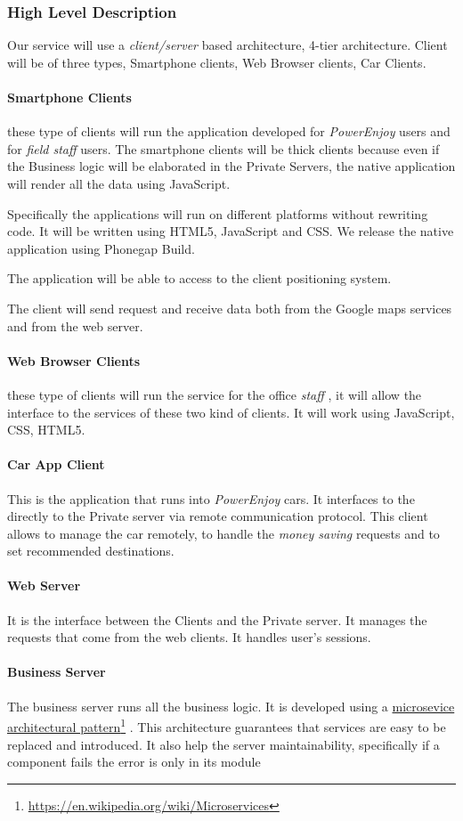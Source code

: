 \documentclass[english]{article}
\newcommand\fnurl[2]{%
	\href{#2}{#1}\footnote{\url{#2}}%
}
\newcommand{\powerenjoy}{\textit{PowerEnjoy }}
\newcommand{\staff}{\textit{staff }}
\newcommand{\fieldstaff}{\textit{field staff }}
\newcommand{\moneysaving}{\textit{money saving }}
\begin{document}
	\subsubsection{High Level Description}
	Our service will use a \textit{client/server} based architecture, 4-tier architecture. Client will be of three types, Smartphone clients, Web Browser clients, Car Clients.
	\paragraph{Smartphone Clients} these type of clients will run the application developed for \powerenjoy users and for \fieldstaff users. The smartphone clients will be thick clients because even  if the Business logic will be elaborated in the Private Servers, the native application will render all the data using JavaScript. 
		\par Specifically the applications will run on different platforms without rewriting code. It will be written using HTML5, JavaScript and CSS. We release the native application using Phonegap Build. 
		\par The application will be able to access to the client positioning system.
		\par The client will send request and receive data both from the Google maps services and from the web server.
	\paragraph{Web Browser Clients} these type of clients will run the service for the office \staff, it will allow the interface to the services of these two kind of clients. It will work using JavaScript, CSS, HTML5. 
	\paragraph{Car App Client} 
	This is the application that runs into \powerenjoy cars. It interfaces to the directly to the Private server via remote communication protocol. This client allows to manage the car remotely, to handle the \moneysaving requests and to set recommended destinations.
	\paragraph{Web Server}
	It is the interface between the Clients and the Private server. It manages the requests that come from the web clients. It handles user's sessions.
	\paragraph{Business Server}
	The business server runs all the business logic. It is developed using a \fnurl{microsevice architectural pattern}{https://en.wikipedia.org/wiki/Microservices}. This architecture guarantees that services are easy to be replaced and introduced. It also help the server maintainability, specifically if a component fails the error is only in its module
\end{document}

